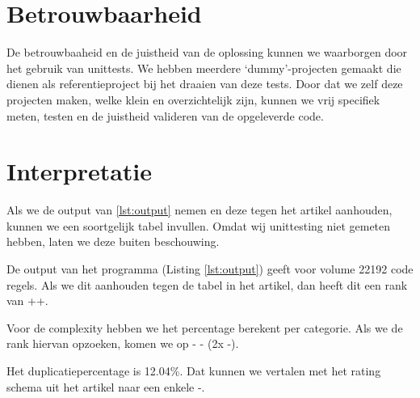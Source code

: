 \documentclass[a4paper]{article}
\begin{document}
\section{Betrouwbaarheid}
De betrouwbaaheid en de juistheid van de oplossing kunnen we waarborgen door het gebruik van unittests. 
We hebben meerdere `dummy'-projecten gemaakt die dienen als referentieproject bij het draaien van deze tests. 
Door dat we zelf deze projecten maken, welke klein en overzichtelijk zijn, kunnen we vrij specifiek meten, testen en de juistheid valideren van de opgeleverde code.

\section{Interpretatie}
Als we de output van \ref{lst:output} nemen en deze tegen het artikel aanhouden, kunnen we een soortgelijk tabel invullen. Omdat wij unittesting niet gemeten hebben, laten we deze buiten beschouwing.

De output van het programma (Listing \ref{lst:output}) geeft voor volume 22192 code regels. Als we dit aanhouden tegen de tabel in het artikel, dan heeft dit een rank van ++.

Voor de complexity hebben we het percentage berekent per categorie. Als we de rank hiervan opzoeken, komen we op - - (2x -).

Het duplicatiepercentage is 12.04\%. Dat kunnen we vertalen met het rating schema uit het artikel naar een enkele -.
\end{document}
